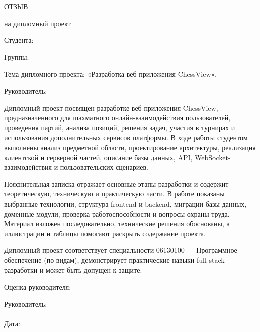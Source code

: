 \clearpage
\thispagestyle{plain}
\begin{center}
ОТЗЫВ

на дипломный проект
\end{center}

Студента: 

Группы: 

Тема дипломного проекта: «Разработка веб-приложения ChessView».

Руководитель: 

\vspace{0.5cm}
Дипломный проект посвящен разработке веб-приложения ChessView, предназначенного для шахматного онлайн-взаимодействия пользователей, проведения партий, анализа позиций, решения задач, участия в турнирах и использования дополнительных сервисов платформы. В ходе работы студентом выполнены анализ предметной области, проектирование архитектуры, реализация клиентской и серверной частей, описание базы данных, API, WebSocket-взаимодействия и пользовательских сценариев.

Пояснительная записка отражает основные этапы разработки и содержит теоретическую, техническую и практическую части. В работе показаны выбранные технологии, структура frontend и backend, миграции базы данных, доменные модули, проверка работоспособности и вопросы охраны труда. Материал изложен последовательно, технические решения обоснованы, а иллюстрации и таблицы помогают раскрыть содержание проекта.

Дипломный проект соответствует специальности 06130100 --- Программное обеспечение (по видам), демонстрирует практические навыки full-stack разработки и может быть допущен к защите.

\vspace{0.4cm}
Оценка руководителя: 

\vspace{0.25cm}
\begin{flushright}
Руководитель: \filledfield{6cm}{[подпись]}\\[0.4cm]
\\[0.4cm]
Дата: 
\end{flushright}
